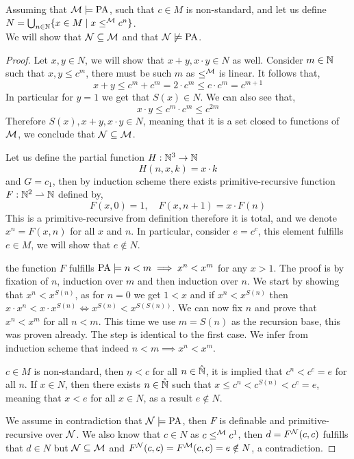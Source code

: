 \question{}
Assuming that $\mathcal{M} \models \operatorname{PA}$, such that $c \in M$ is non-standard, and let us define $N = \bigcup_{n \in \mathbb{N}} \{ x \in M \mid x \le^{\mathcal{M}} c^n \}$. \\
We will show that $\mathcal{N} \subseteq \mathcal{M}$ and that $\mathcal{N} \not\models \operatorname{PA}$.
\begin{proof}
	Let $x, y \in N$, we will show that $x + y, x \cdot y \in N$ as well.
	Consider $m \in \mathbb{N}$ such that $x, y \le c^m$, there must be such $m$ as $\le^{\mathcal{M}}$ is linear.
	It follows that,
	\[
		x + y
		\le c^m + c^m
		= 2 \cdot c^m
		\le c \cdot c^m
		= c^{m + 1}
	\]
	In particular for $y = 1$ we get that $S(x) \in N$.
	We can also see that,
	\[
		x \cdot y
		\le c^m \cdot c^m
		\le c^{2m}
	\]
	Therefore $S(x), x + y, x \cdot y \in N$, meaning that it is a set closed to functions of $\mathcal{M}$, we conclude that $\mathcal{N} \subseteq \mathcal{M}$.

	Let us define the partial function $H : \mathbb{N}^3 \to \mathbb{N}$
	\[
		H(n, x, k)
		= x \cdot k
	\]
	and $G = c_1$, then by induction scheme there exists primitive-recursive function $F : \mathbb{N}^2 \rightharpoonup \mathbb{N}$ defined by,
	\[
		F(x, 0) = 1,
		\quad
		F(x, n + 1)
		= x \cdot F(n)
	\]
	This is a primitive-recursive from definition therefore it is total, and we denote $x^n = F(x, n)$ for all $x$ and $n$.
	In particular, consider $e = c^c$, this element fulfills $e \in M$, we will show that $e \notin N$.

	the function $F$ fulfills $\operatorname{PA} \models n < m \implies x^n < x^m$ for any $x > 1$.
	The proof is by fixation of $n$, induction over $m$ and then induction over $n$.
	We start by showing that $x^n < x^{S(n)}$, as for $n = 0$ we get $1 < x$ and if $x^n < x^{S(n)}$ then $x \cdot x^n < x \cdot x^{S(n)} \iff x^{S(n)} < x^{S(S(n))}$.
	We can now fix $n$ and prove that $x^n < x^m$ for all $n < m$.
	This time we use $m = S(n)$ as the recursion base, this was proven already.
	The step is identical to the first case.
	We infer from induction scheme that indeed $n < m \implies x^n < x^m$.

	$c \in M$ is non-standard, then $\underline{n} < c$ for all $n \in \hat{\mathbb{N}}$, it is implied that $c^n < c^c = e$ for all $n$.
	If $x \in N$, then there exists $n \in \hat{\mathbb{N}}$ such that $x \le c^n < c^{S(n)} < c^c = e$, meaning that $x < e$ for all $x \in N$, as a result $e \notin N$.

	We assume in contradiction that $\mathcal{N} \models \operatorname{PA}$, then $F$ is definable and primitive-recursive over $\mathcal{N}$.
	We also know that $c \in N$ as $c \le^{\mathcal{M}} c^1$, then $d = F^{\mathcal{N}}(c, c)$ fulfills that $d \in N$ but $\mathcal{N} \subseteq \mathcal{M}$ and $F^{\mathcal{N}}(c, c) = F^{\mathcal{M}}(c, c) = e \notin N$, a contradiction.
\end{proof}

